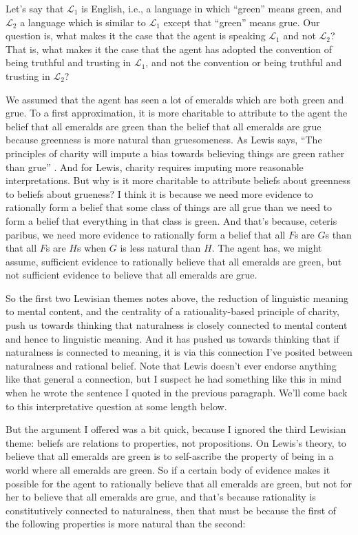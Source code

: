 Let's say that $\mathcal{L}_1$ is English, i.e., a language in which ``green'' means green, and $\mathcal{L}_2$ a language which is similar to $\mathcal{L}_1$ except that ``green'' means grue. Our question is, what makes it the case that the agent is speaking $\mathcal{L}_1$ and not $\mathcal{L}_2$? That is, what makes it the case that the agent has adopted the convention of being truthful and trusting in $\mathcal{L}_1$, and not the convention or being truthful and trusting in $\mathcal{L}_2$? 

We assumed that the agent has seen a lot of emeralds which are both green and grue. To a first approximation, it is more charitable to attribute to the agent the belief that all emeralds are green than the belief that all emeralds are grue because greenness is more natural than gruesomeness. As Lewis says, ``The principles of charity will impute a bias towards believing things are green rather than grue'' \citeyearpar[375]{Lewis1983e}. And for Lewis, charity requires imputing more reasonable interpretations. But why is it more charitable to attribute beliefs about greenness to beliefs about grueness? I think it is because we need more evidence to rationally form a belief that some class of things are all grue than we need to form a belief that everything in that class is green. And that's because, ceteris paribus, we need more evidence to rationally form a belief that all $F$s are $G$s than that all $F$s are $H$s when $G$ is less natural than $H$. The agent has, we might assume, sufficient evidence to rationally believe that all emeralds are green, but not sufficient evidence to believe that all emeralds are grue. 

So the first two Lewisian themes notes above, the reduction of linguistic meaning to mental content, and the centrality of a rationality-based principle of charity, push us towards thinking that naturalness is closely connected to mental content and hence to linguistic meaning. And it has pushed us towards thinking that if naturalness is connected to meaning, it is via this connection I've posited between naturalness and rational belief. Note that Lewis doesn't ever endorse anything like that general a connection, but I suspect he had something like this in mind when he wrote the sentence I quoted in the previous paragraph. We'll come back to this interpretative question at some length below.

But the argument I offered was a bit quick, because I ignored the third Lewis\-ian theme: beliefs are relations to properties, not propositions. On Lewis's theory, to believe that all emeralds are green is to self-ascribe the property of being in a world where all emeralds are green. So if a certain body of evidence makes it possible for the agent to rationally believe that all emeralds are green, but not for her to believe that all emeralds are grue, and that's because rationality is constitutively connected to naturalness, then that must be because the first of the following properties is more natural than the second:

